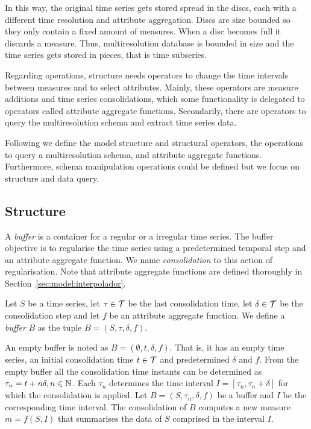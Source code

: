 In this way, the original time series gets stored spread in the discs,
each with a different time resolution and attribute aggregation.
Discs are size bounded so they only contain a fixed amount of
measures. When a disc becomes full it discards a measure. Thus,
multiresolution database is bounded in size and the time series gets
stored in pieces, that is time subseries.

Regarding operations,  structure needs operators to change
the time intervals between measures and to select attributes. Mainly,
these operators are measure additions and time series consolidations,
which some functionality is delegated to operators called attribute
aggregate functions. Secondarily, there are operators to query the
multiresolution schema and extract time series data.


Following we define the  model structure and structural
operators, the operations to query a multiresolution schema, and
attribute aggregate functions.  Furthermore, schema manipulation
operations could be defined but we focus on structure and data query.


\subsection{Structure}

A \emph{buffer} is a container for a regular or a irregular time
series. The buffer objective is to regularise the time series using a
predetermined temporal step and an attribute aggregate function.  We
name \emph{consolidation} to this action of regularisation.  Note that
attribute aggregate functions are defined thoroughly in
Section~\ref{sec:model:interpolador}.
\begin{definition}%
  Let $S$ be a time series, let $\tau\in\cal{T}$ be the last
  consolidation time, let $\delta\in\cal{T}$ be the consolidation step
  and let $f$ be an attribute aggregate function. We define a
  \emph{buffer} $B$ as the tuple $B=(S,\tau,\delta,f)$.
\end{definition}

An empty buffer is noted as $B = (\emptyset,t, \delta, f)$. That is,
it has an empty time series, an initial consolidation time
$t\in\cal{T}$ and predetermined $\delta$ and $f$.  From the empty
buffer all the consolidation time instants can be determined as
$\tau_n=t+n\delta, n\in\mathbb{N}$.  Each $\tau_n$ determines the time
interval $I=[\tau_n,\tau_n+\delta]$ for which the consolidation is
applied. Let $B=(S,\tau_n,\delta,f)$ be a buffer and $I$ be the
corresponding time interval. The consolidation of $B$ computes a new
measure $m=f(S,I)$ that summarises the data of $S$ comprised in the
interval $I$.

